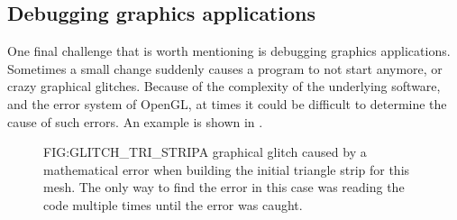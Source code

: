 \subsection{Debugging graphics applications}

One final challenge that is worth mentioning is debugging graphics applications.
Sometimes a small change suddenly causes a program to not start anymore,
or crazy graphical glitches.
Because of the complexity of the underlying software,
and the error system of OpenGL,
at times it could be difficult to determine the cause of such errors.
An example is shown in .

\begin{figure}[Graphical glitch \textemdash\, Triangle strip]{FIG:GLITCH_TRI_STRIP}{A graphical glitch caused by a mathematical error when building the initial triangle strip for this mesh. The only way to find the error in this case was reading the code multiple times until the error was caught.}
\end{figure}

  
